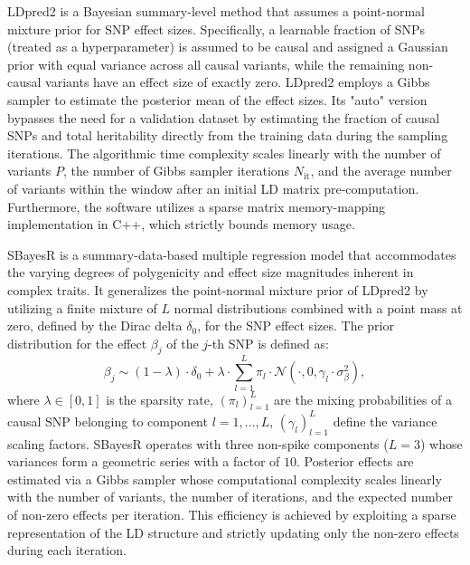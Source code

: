 LDpred2 \cite{ldpred} is a Bayesian summary-level method that assumes a point-normal mixture prior for SNP effect sizes. Specifically, a learnable fraction of SNPs (treated as a hyperparameter) is assumed to be causal and assigned a Gaussian prior with equal variance across all causal variants, while the remaining non-causal variants have an effect size of exactly zero. LDpred2 employs a Gibbs sampler to estimate the posterior mean of the effect sizes. Its "auto" version bypasses the need for a validation dataset by estimating the fraction of causal SNPs and total heritability directly from the training data during the sampling iterations. The algorithmic time complexity scales linearly with the number of variants $P$, the number of Gibbs sampler iterations $N_{\text{it}}$, and the average number of variants within the window after an initial LD matrix pre-computation. Furthermore, the software utilizes a sparse matrix memory-mapping implementation in C++, which strictly bounds memory usage.

SBayesR \cite{sbayesr} is a summary-data-based multiple regression model that accommodates the varying degrees of polygenicity and effect size magnitudes inherent in complex traits. It generalizes the point-normal mixture prior of LDpred2 by utilizing a finite mixture of $L$ normal distributions combined with a point mass at zero, defined by the Dirac delta $\delta_0$, for the SNP effect sizes. The prior distribution for the effect $\beta_j$ of the $j$-th SNP is defined as:
\begin{equation}
\beta_j \sim (1-\lambda) \cdot \delta_0 + \lambda \cdot \sum_{l=1}^{L} \pi_l \cdot \mathcal{N}(\cdot, 0, \gamma_l \cdot \sigma_{\beta}^2),
\end{equation}
where $\lambda \in [0,1]$ is the sparsity rate, $(\pi_l)_{l=1}^L$ are the mixing probabilities of a causal SNP belonging to component $l=1,\dots,L$, $(\gamma_l)_{l=1}^L$ define the variance scaling factors.
SBayesR operates with three non-spike components ($L=3$) whose variances form a geometric series with a factor of $10$. Posterior effects are estimated via a Gibbs sampler whose computational complexity scales linearly with the number of variants, the number of iterations, and the expected number of non-zero effects per iteration. This efficiency is achieved by exploiting a sparse representation of the LD structure and strictly updating only the non-zero effects during each iteration. 
